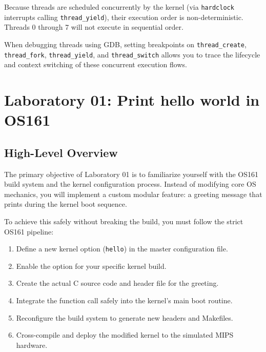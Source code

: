 Because threads are scheduled concurrently by the kernel (via \texttt{hardclock} interrupts calling \texttt{thread\_yield}), their execution order is non-deterministic. Threads 0 through 7 will not execute in sequential order.

When debugging threads using GDB, setting breakpoints on \texttt{thread\_create}, \texttt{thread\_fork}, \texttt{thread\_yield}, and \texttt{thread\_switch} allows you to trace the lifecycle and context switching of these concurrent execution flows.

\newpage

\section{Laboratory 01: Print hello world in OS161}

\subsection{High-Level Overview}
The primary objective of Laboratory 01 is to familiarize yourself with the OS161 build system and the kernel configuration process. Instead of modifying core OS mechanics, you will implement a custom modular feature: a greeting message that prints during the kernel boot sequence.

To achieve this safely without breaking the build, you must follow the strict OS161 pipeline:
\begin{enumerate}
    \item Define a new kernel option (\texttt{hello}) in the master configuration file.
    \item Enable the option for your specific kernel build.
    \item Create the actual C source code and header file for the greeting.
    \item Integrate the function call safely into the kernel's main boot routine.
    \item Reconfigure the build system to generate new headers and Makefiles.
    \item Cross-compile and deploy the modified kernel to the simulated MIPS hardware.
\end{enumerate}

